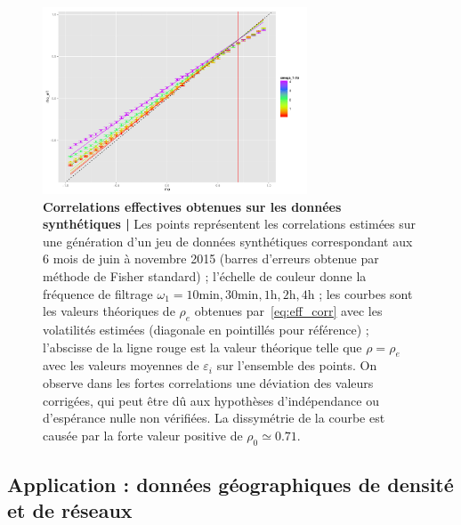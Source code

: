 \begin{figure}
\centering
\includegraphics[width=0.7\textwidth]{figures/effectiveCorrs_withGoodTh_A4}
\caption{\textbf{Correlations effectives obtenues sur les données synthétiques | } Les points représentent les correlations estimées sur une génération d'un jeu de données synthétiques correspondant aux 6 mois de juin à novembre 2015 (barres d'erreurs obtenue par méthode de Fisher standard) ; l'échelle de couleur donne la fréquence de filtrage $\omega_1=10\textrm{min},30\textrm{min},1\textrm{h},2\textrm{h},4\textrm{h}$ ; les courbes sont les valeurs théoriques de $\rho_e$ obtenues par~\ref{eq:eff_corr} avec les volatilités estimées (diagonale en pointillés pour référence) ; l'abscisse de la ligne rouge est la valeur théorique telle que $\rho = \rho_e$ avec les valeurs moyennes de $\varepsilon_i$ sur l'ensemble des points. On observe dans les fortes correlations une déviation des valeurs corrigées, qui peut être dû aux hypothèses d'indépendance ou d'espérance nulle non vérifiées. La dissymétrie de la courbe est causée par la forte valeur positive de $\rho_0 \simeq 0.71$.}
\label{fig:effective_corrs}
\end{figure}


\begin{figure}

\caption{}
\label{fig:model_perf}
\end{figure}





\subsection{Application : données géographiques de densité et de réseaux}


